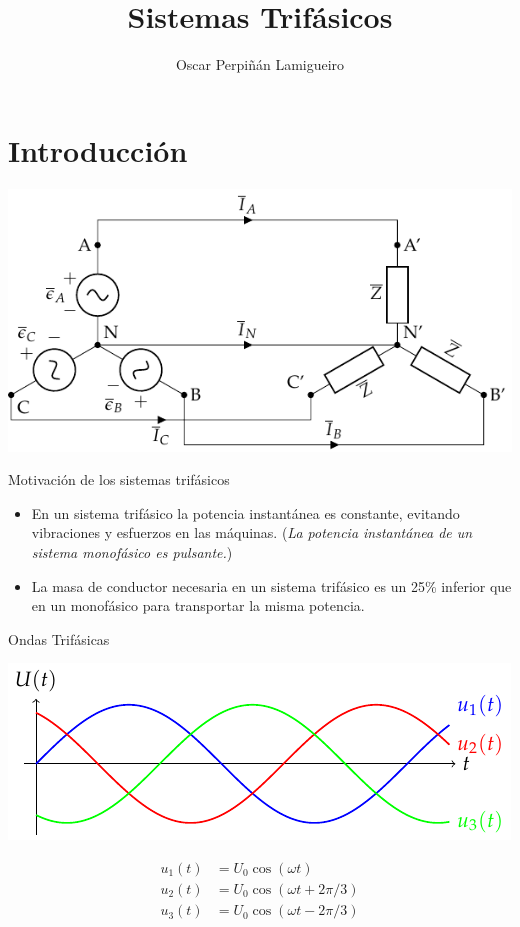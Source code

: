 \documentclass[aspectratio=169, xcolor={usenames,svgnames,dvipsnames}]{beamer}
\author{Oscar Perpiñán Lamigueiro}
\date{}
\title{Sistemas Trifásicos}
\begin{document}
\maketitle

\section{Introducción}
\label{sec:org28ec705}

\begin{frame}[label={sec:orgdae3baa},plain]{}
\begin{center}
\includegraphics[width=.9\linewidth]{figs/EstrellaEquilibrado.pdf}
\end{center}
\end{frame}

\begin{frame}[label={sec:orge4b954e}]{Motivación de los sistemas trifásicos}
\begin{itemize}
\item En un sistema trifásico la potencia instantánea es constante, evitando vibraciones y esfuerzos en las máquinas. (\emph{La potencia instantánea de un sistema monofásico es pulsante.})

\item La masa de conductor necesaria en un sistema trifásico es un 25\% inferior que en un monofásico para transportar la misma potencia.
\end{itemize}
\end{frame}

\begin{frame}[label={sec:org5509680}]{Ondas Trifásicas}
\begin{center}
\includegraphics[width=.9\linewidth]{figs/TensionesTrifasica.pdf}
\end{center}

\begin{align*}
  u_1(t) &= U_0 \cos(\omega t)\\
  u_2(t) &= U_0 \cos(\omega t + 2\pi/3)\\
  u_3(t) &= U_0 \cos(\omega t - 2\pi/3)
\end{align*}
\end{frame}
\end{document}
